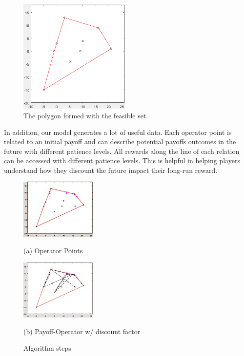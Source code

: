 \documentclass{article}
\begin{document}
\begin{figure}[!ht]

\begin{minipage}[b]{1.0\linewidth}
  \centering
  \centerline{\includegraphics[width=5.5cm]{FeasibleSet}}
\caption{ The polygon formed with the feasible set.}
\label{fig:res}
\end{minipage}
%
\end{figure}
In addition, our model generates a lot of useful data. Each operator point is related to an initial payoff and can describe potential payoffs outcomes in the future with different patience levels. All rewards along the line of each relation can be accessed with different patience levels. This is helpful in helping players understand how they discount the future impact their long-run reward.

\begin{figure}[!ht]
\begin{minipage}[b]{.48\linewidth}
  \centering
  \centerline{\includegraphics[width=3.75cm]{OperatorPoints}}
\centerline{(a) Operator Points}\medskip
\end{minipage}
\hfill
\begin{minipage}[b]{0.48\linewidth}
  \centering
  \centerline{\includegraphics[width=3.75cm]{applyingDiscountFactor}}
\centerline{(b) Payoff-Operator w/ discount factor}\medskip
\end{minipage}
%
\caption{Algorithm steps }
\label{fig:res}
%
\end{figure}
\end{document}
